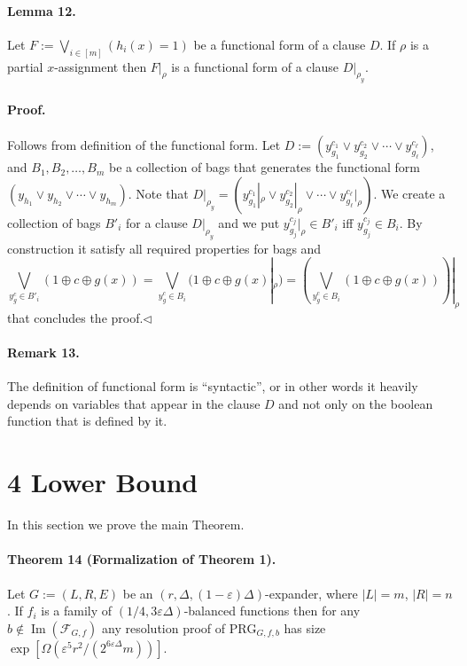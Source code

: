 \documentclass[10pt,a4paper]{article}
\begin{document}
\paragraph{Lemma 12.} Let $F:=\bigvee_{i\in[m]}(h_i(x)=1)$ be a functional form of a clause $D$. If $\rho$ is a partial $x$-assignment then $F|_\rho$ is a functional form of a clause $D|_{\rho_y}$.
\paragraph{Proof.} Follows from definition of the functional form. Let $D:=(y_{g_1}^{c_1}\vee y_{g_2}^{c_2}\vee\cdots\vee y_{g_\ell}^{c_\ell})$, and $B_1,B_2,\ldots,B_m$ be a collection of bags that generates the functional form $(y_{h_1}\vee y_{h_2}\vee\cdots\vee y_{h_m})$.
Note that $D|_{\rho_y}=(y_{g_1}^{c_1}|_\rho\vee y_{g_2}^{c_2}|_\rho\vee\cdots\vee y_{g_\ell}^{c_\ell}|_\rho)$. We create a collection of bags $B'_i$ for a clause $D|_{\rho_y}$ and we put $y_{g_j}^{c_j}|_\rho\in B'_i$ iff $y_{g_j}^{c_j}\in B_i$. By construction it satisfy all required properties for bags and
\[\bigvee_{y_g^c\in B'_i}(1\oplus c\oplus g(x))=\bigvee_{y_g^c\in B_i}(1\oplus c\oplus g(x)|_\rho)=\left(\bigvee_{y_g^c\in B_i}(1\oplus c\oplus g(x))\right)|_\rho\]
that concludes the proof.\hfill$\triangleleft$
\paragraph{Remark 13.} The definition of functional form is ``syntactic'', or in other words it heavily depends on variables that appear in the clause $D$ and not only on the boolean function that is defined by it.
\section*{4 Lower Bound}
In this section we prove the main Theorem.

\paragraph{Theorem 14 (Formalization of Theorem 1).} Let $G:=(L,R,E)$ be an $(r,\Delta,(1-\varepsilon)\Delta)$-expander, where $|L|=m$, $|R|=n$. If $f_i$ is a family of $(1/4,3\varepsilon\Delta)$-balanced functions then for any $b\notin\operatorname{Im}(\mathcal F_{G,f})$ any resolution proof of $\mathrm{PRG}_{G,f,b}$ has size $\exp[\Omega(\varepsilon^5r^2/(2^{6\varepsilon\Delta}m))]$.
\end{document}
